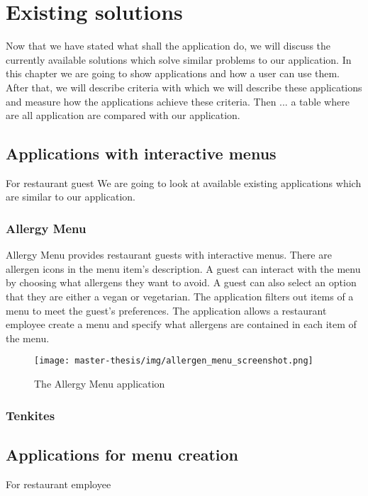 \chapter{Existing solutions}
Now that we have stated what shall the application do, we will discuss the currently available solutions which solve similar problems to our application.
In this chapter we are going to show applications and how a user can use them.
After that, we will describe criteria with which we will describe these applications and measure how the applications achieve these criteria.
Then ... a table where are all application are compared with our application.

\section{Applications with interactive menus}
For restaurant guest
We are going to look at available existing applications which are similar to our application.

\subsection{Allergy Menu}
Allergy Menu provides restaurant guests with interactive menus.
There are allergen icons in the menu item's description.
A guest can interact with the menu by choosing what allergens they want to avoid.
A guest can also select an option that they are either a vegan or vegetarian.
The application filters out items of a menu to meet the guest's preferences.
The application allows a restaurant employee create a menu and specify what allergens are contained in each item of the menu.

\begin{figure}[h]
  \centering
  \texttt{[image: master-thesis/img/allergen\_menu\_screenshot.png]}
  \caption{The Allergy Menu application}
\end{figure}

\subsection{Tenkites}

\section{Applications for menu creation}
For restaurant employee


